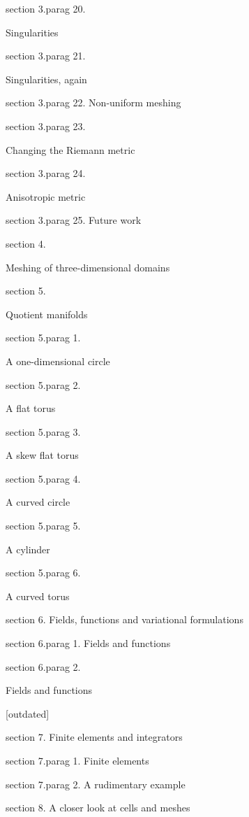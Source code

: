 \numb section 3.\numb parag 20.
Singularities

\numb section 3.\numb parag 21.
Singularities, again

\numb section 3.\numb parag 22. Non-uniform meshing

\numb section 3.\numb parag 23. 
Changing the Riemann metric

\numb section 3.\numb parag 24. 
Anisotropic metric

\numb section 3.\numb parag 25. Future work

\medskip\noindent
\numb section 4. Meshing of three-dimensional domains

\medskip\noindent
\numb section 5. Quotient manifolds

\numb section 5.\numb parag 1. A one-dimensional circle

\numb section 5.\numb parag 2. A flat torus

\numb section 5.\numb parag 3. A skew flat torus

\numb section 5.\numb parag 4. A curved circle

\numb section 5.\numb parag 5. A cylinder

\numb section 5.\numb parag 6. A curved torus


\medskip\noindent
\numb section 6. Fields, functions and variational formulations

\numb section 6.\numb parag 1. Fields and functions

\numb section 6.\numb parag 2. Fields and functions [outdated]


\medskip\noindent
\numb section 7. Finite elements and integrators

\numb section 7.\numb parag 1. Finite elements

\numb section 7.\numb parag 2. A rudimentary example


\medskip\noindent
\numb section 8. A closer look at cells and meshes

